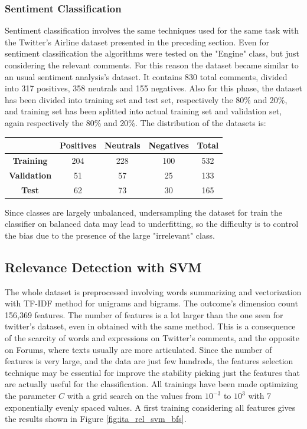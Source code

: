 \subsubsection{Sentiment Classification}

Sentiment classification involves the same techniques used for the same task with the Twitter's Airline dataset presented in the preceding section. Even for sentiment classification the algorithms were tested on the "Engine" class, but just considering the relevant comments. For this reason the dataset became similar to an usual sentiment analysis's dataset. It contains 830 total comments, divided into 317 positives, 358 neutrals and 155 negatives. Also for this phase, the dataset has been divided into training set and test set, respectively the 80\% and 20\%, and training set has been splitted into actual training set and validation set, again respectively the 80\% and 20\%. The distribution of the datasets is:

\begin{center}
	\begin{tabular}{ | c  c  c c | c | } 
		\hline
		& \textbf{Positives} & \textbf{Neutrals} & \textbf{Negatives} & \textbf{Total} \\
		\hline
		\textbf{Training} & 204 & 228 & 100 & 532 \\ 
		\hline
		\textbf{Validation} & 51 & 57 & 25 & 133 \\ 
		\hline
		\textbf{Test} & 62 & 73 & 30 & 165 \\
		\hline
	\end{tabular}
\end{center}

Since classes are largely unbalanced, undersampling the dataset for train the classifier on balanced data may lead to underfitting, so the difficulty is to control the bias due to the presence of the large "irrelevant" class.



\subsection{Relevance Detection with SVM}

The whole dataset is preprocessed involving words summarizing and vectorization with TF-IDF method for unigrams and bigrams. The outcome's dimension count 156,369 features. The number of features is a lot larger than the one seen for twitter's dataset, even in obtained with the same method. This is a consequence of the scarcity of words and expressions on Twitter's comments, and the opposite on Forums, where texts usually are more articulated. Since the number of features is very large, and the data are just few hundreds, the features selection technique may be essential for improve the stability picking just the features that are actually useful for the classification. All trainings have been made optimizing the parameter $C$ with a grid search on the values from $10^{-3}$ to $10^3$ with 7 exponentially evenly spaced values. A first training considering all features gives the results shown in Figure \ref{fig:ita_rel_svm_bfs}.

